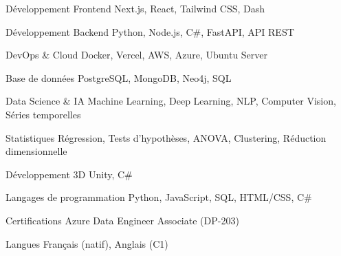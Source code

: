 


\begin{cvskills}


\cvskill
{Développement Frontend} %
{Next.js, React, Tailwind CSS, Dash} %


\cvskill
{Développement Backend} %
{Python, Node.js, C\#, FastAPI, API REST} %


\cvskill
{DevOps \& Cloud} %
{Docker, Vercel, AWS, Azure, Ubuntu Server} %


\cvskill
{Base de données} %
{PostgreSQL, MongoDB, Neo4j, SQL} %


\cvskill
{Data Science \& IA} %
{Machine Learning, Deep Learning, NLP, Computer Vision, Séries temporelles} %


\cvskill
{Statistiques} %
{Régression, Tests d'hypothèses, ANOVA, Clustering, Réduction dimensionnelle} %


\cvskill
{Développement 3D} %
{Unity, C\#} %


\cvskill
{Langages de programmation} %
{Python, JavaScript, SQL, HTML/CSS, C\#} %


\cvskill
{Certifications} %
{Azure Data Engineer Associate (DP-203)} %


\cvskill
{Langues} %
{Français (natif), Anglais (C1)} %


\end{cvskills}